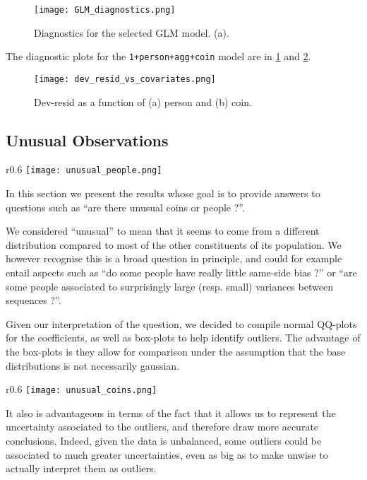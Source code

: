 \documentclass[a4paper, 12pt,oneside]{article}
\begin{document}
			\begin{figure}[htb]
				\centering
				\texttt{[image: GLM\_diagnostics.png]}
				\caption{Diagnostics for the selected GLM model. (a).}
				\label{fig:glm-diagnostic}
			\end{figure}
			The diagnostic plots for the \texttt{1+person+agg+coin} model are in \ref{fig:glm-diagnostic} and \ref{fig:dev-resid-vs-covariates}. 
			\begin{figure}[htb]
				\centering
				\texttt{[image: dev\_resid\_vs\_covariates.png]}
				\caption{Dev-resid as a function of (a) person and (b) coin.}
				\label{fig:dev-resid-vs-covariates}
			\end{figure}	
		\newpage
		\subsection{Unusual Observations}
		\begin{wrapfigure}[15]{r}{0.6\textwidth}
			\vspace{-2em}
			\centering
			\texttt{[image: unusual\_people.png]}
			\caption{Distribution inspection for estimated person-parameters in the \texttt{1+person+coin} GLM model.}
			\label{fig:unusual-persons}
		\end{wrapfigure}
		In this section we present the results whose goal is to provide answers to questions such as ``are there unusual coins or people ?''. 
		
		We considered ``unusual'' to mean that it seems to come from a different distribution compared to most of the other constituents of its population. We however recognise this is a broad question in principle, and could for example entail aspects such as ``do some people have really little same-side bias ?'' or ``are some people associated to surprisingly large (resp. small) variances between sequences ?''.

		Given our interpretation of the question, we decided to compile normal QQ-plots for the coefficients, as well as box-plots to help identify outliers. The advantage of the box-plots is they allow for comparison under the assumption that the base distributions is not necessarily gaussian. 
		\begin{wrapfigure}[16]{r}{0.6\textwidth}
			\vspace{-1em}
			\centering
			\texttt{[image: unusual\_coins.png]}
			\caption{Distribution inspection for estimated coin-parameters in the \texttt{1+person+coin} GLM model.}
			\label{fig:unusual-coins}
		\end{wrapfigure}
		It also is advantageous in terms of the fact that it allows us to represent the uncertainty associated to the outliers, and therefore draw more accurate conclusions. Indeed, given the data is unbalanced, some outliers could be associated to much greater uncertainties, even as big as to make unwise to actually interpret them as outliers. 
		
\end{document}
